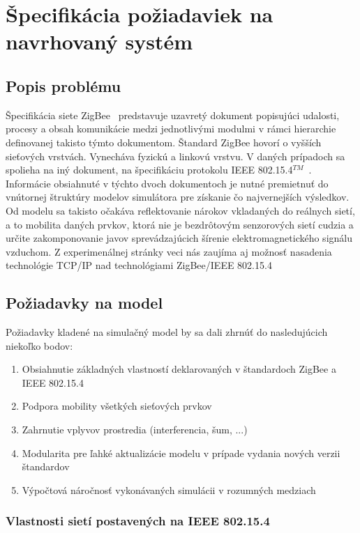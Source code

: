 \chapter{Špecifikácia požiadaviek na navrhovaný systém}

\section{Popis problému}

\indent\indent Špecifikácia siete ZigBee~\cite{zigbee08} predstavuje uzavretý dokument popisujúci udalosti, procesy a obsah komunikácie medzi jednotlivými modulmi v rámci hierarchie definovanej takisto týmto dokumentom. Štandard ZigBee hovorí o vyšších sieťových vrstvách. Vynecháva fyzickú a linkovú vrstvu. V daných prípadoch sa spolieha na iný dokument, na špecifikáciu protokolu IEEE 802.15.4$^{TM}$~\cite{ieee06}.\\
\indent\indent Informácie obsiahnuté v týchto dvoch dokumentoch je nutné premietnuť do vnútornej štruktúry modelov simulátora pre získanie čo najvernejších výsledkov. Od modelu sa takisto očakáva reflektovanie nárokov vkladaných do reálnych sietí, a to mobilita daných prvkov, ktorá nie je bezdrôtovým senzorových sietí cudzia a určite zakomponovanie javov sprevádzajúcich šírenie elektromagnetického signálu vzduchom. Z experimenálnej stránky veci nás zaujíma aj možnosť nasadenia technológie TCP/IP nad technológiami ZigBee/IEEE 802.15.4

\section{Požiadavky na model}

\indent\indent Požiadavky kladené na simulačný model by sa dali zhrnúť do nasledujúcich niekoľko bodov:
\begin{enumerate}
  \item Obsiahnutie základných vlastností deklarovaných v štandardoch ZigBee a IEEE 802.15.4
  \item Podpora mobility všetkých sieťových prvkov
  \item Zahrnutie vplyvov prostredia (interferencia, šum, ...)
  \item Modularita pre ľahké aktualizácie modelu v prípade vydania nových verzii štandardov
  \item Výpočtová náročnosť vykonávaných simulácii v rozumných medziach
\end{enumerate}

\subsection{Vlastnosti sietí postavených na IEEE 802.15.4}

